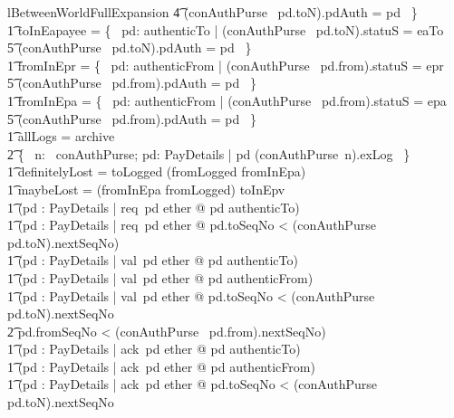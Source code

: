 \begin{LNewLemma}
\begin{theorem}{lBetweenWorldFullExpansion}
                    \t4 \land (conAuthPurse~ pd.toN).pdAuth = pd ~\} \land \\ \t1
            toInEapayee = \{~ pd: authenticTo | (conAuthPurse~ pd.toN).statuS = eaTo \\
                    \t5 \land (conAuthPurse~ pd.toN).pdAuth = pd ~\} \land \\ \t1
            fromInEpr = \{~ pd: authenticFrom | (conAuthPurse~ pd.from).statuS = epr \\
                    \t5 \land (conAuthPurse~ pd.from).pdAuth = pd ~\} \land \\ \t1
            fromInEpa = \{~ pd: authenticFrom | (conAuthPurse~ pd.from).statuS = epa \\
                    \t5 \land (conAuthPurse~ pd.from).pdAuth = pd ~\} \land \\ \t1
            allLogs = archive \cup \\
                \t2 \{~ n: \dom~conAuthPurse; pd: PayDetails | pd \in (conAuthPurse~n).exLog ~\} \land \\ \t1
            definitelyLost = toLogged \cap (fromLogged \cup fromInEpa) \land \\ \t1
            maybeLost = (fromInEpa \cup fromLogged) \cap toInEpv \land \\
    \t1
            (\forall pd : PayDetails | req~pd \in ether @ pd \in authenticTo)
            \land \\ \t1
            (\forall pd : PayDetails | req~pd \in ether @
                 pd.toSeqNo < (conAuthPurse~ pd.toN).nextSeqNo) \\ \t1
            \land
            (\forall pd : PayDetails | val~pd \in ether @ pd \in authenticTo) \land \\ \t1
            (\forall pd : PayDetails | val~pd \in ether @ pd \in authenticFrom) \land \\ \t1
            (\forall pd : PayDetails | val~pd \in ether @ pd.toSeqNo < (conAuthPurse~ pd.toN).nextSeqNo \\
                \t2 \land pd.fromSeqNo < (conAuthPurse~ pd.from).nextSeqNo) \land \\ \t1
            (\forall pd : PayDetails | ack~pd \in ether @ pd \in authenticTo)\land  \\ \t1
            (\forall pd : PayDetails | ack~pd \in ether @ pd \in authenticFrom) \land \\ \t1
            (\forall pd : PayDetails | ack~pd \in ether @ pd.toSeqNo < (conAuthPurse~ pd.toN).nextSeqNo  \\ %

\end{theorem}
\end{LNewLemma}
